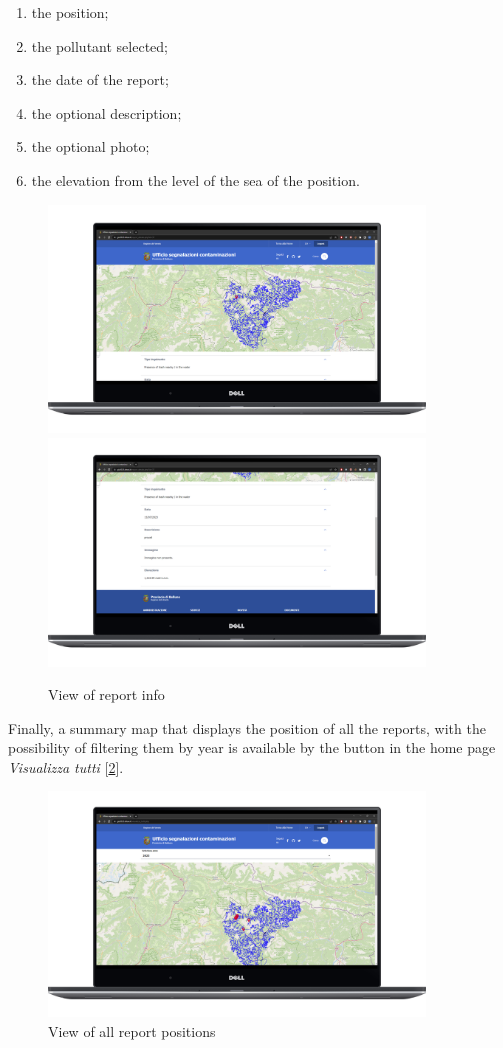 \begin{itemize}
\begin{enumerate}
        \item the position;
        \item the pollutant selected;
        \item the date of the report;
        \item the optional description;
        \item the optional photo;
        \item the elevation from the level of the sea of the position.
    \end{enumerate}
    \begin{figure}[H] \centering \includegraphics[width=27em]{img/pos_rep.png} \includegraphics[width=27em]{img/dati_rep.png} \caption{View of report info}  \label{reportView} \end{figure}
    Finally, a summary map that displays the position of all the reports, with the possibility of filtering them by year is available by the button in the home page \textit{Visualizza tutti} [\ref{allPositions}].
    \begin{figure}[H]\centering \includegraphics[width=27em]{img/all_reports.png} \caption{View of all report positions} \label{allPositions}\end{figure}
    
\end{itemize}

